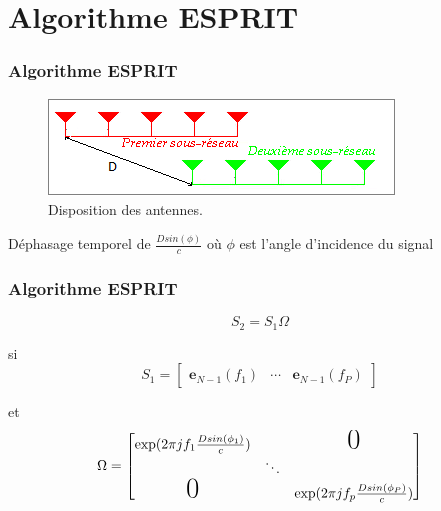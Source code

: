 \documentclass[10pt]{beamer}
\begin{document}

\section{Algorithme ESPRIT}
\begin{frame}
%
\frametitle{Algorithme ESPRIT}

\begin{figure}[h]
\centering
\includegraphics[scale=.6]{images/ReseauEsprit}
\caption{Disposition des antennes.}
\end{figure}

Déphasage temporel de \( \frac{D sin(\phi) }{c}  \) où
\(\phi\) est l'angle d'incidence du signal


\end{frame}


\begin{frame}
%
\frametitle{Algorithme ESPRIT}

\begin{equation}
S_2 = S_1 \Omega
\end{equation}

si \[ S_1 = \begin{bmatrix}
\boldsymbol{e}_{N-1}(f_1) & \cdots & \boldsymbol{e}_{N-1}(f_P)
\end{bmatrix} \]

et \[ \Omega = \begin{bmatrix}
\exp(2\pi j f_1 \frac{D sin(\phi_1) }{c}) & & \text{\huge0}\\
&  \ddots \\
\text{\huge0} & & \exp(2\pi j f_p \frac{D sin(\phi_P) }{c})\\

\end{bmatrix} \]

\end{frame}

\end{document}
